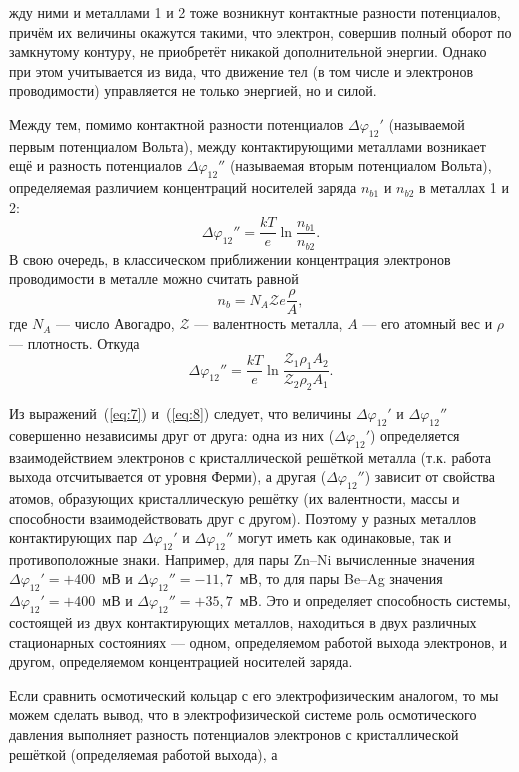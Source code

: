 \documentclass[12pt,a4paper]{article}
\begin{document}
жду ними и металлами 1 и 2 тоже возникнут контактные разности потенциалов,
причём их величины окажутся такими, что электрон, совершив полный оборот по
замкнутому контуру, не приобретёт никакой дополнительной энергии. Однако при
этом учитывается из вида, что движение тел (в том числе и электронов
проводимости) управляется не только энергией, но и силой.

Между тем, помимо контактной разности потенциалов $\Delta\varphi_{12}'$
(называемой первым потенциалом Вольта), между контактирующими металлами
возникает ещё и разность потенциалов $\Delta\varphi_{12}''$ (называемая вторым
потенциалом Вольта), определяемая различием концентраций носителей заряда
$n_{b1}$ и $n_{b2}$ в металлах 1 и 2:
\[
\Delta\varphi_{12}'' = \frac{kT}{e}\ln\frac{n_{b1}}{n_{b2}}.
\]
В свою очередь, в классическом приближении концентрация электронов проводимости
в металле можно считать равной
\[
n_b = N_A \mathcal{Z} e \frac{\rho}{A},
\]
где $N_A$ — число Авогадро, $\mathcal{Z}$ — валентность металла, $A$ — его
атомный вес и $\rho$ — плотность. Откуда
\begin{equation}
\Delta\varphi_{12}'' = \frac{kT}{e}\ln\frac{\mathcal{Z}_1 \rho_1 A_2}
{\mathcal{Z}_2 \rho_2 A_1}. \label{eq:8}
\end{equation}

Из выражений~(\ref{eq:7}) и~(\ref{eq:8}) следует, что величины $\Delta\varphi_{12}'$
и $\Delta\varphi_{12}''$ совершенно независимы друг от друга: одна из них
($\Delta\varphi_{12}'$) определяется взаимодействием электронов с кристаллической
решёткой металла (т.к. работа выхода отсчитывается от уровня Ферми), а другая
($\Delta\varphi_{12}''$) зависит от свойства атомов, образующих кристаллическую
решётку (их валентности, массы и способности взаимодействовать друг с другом).
Поэтому у разных металлов контактирующих пар $\Delta\varphi_{12}'$ и
$\Delta\varphi_{12}''$ могут иметь как одинаковые, так и противоположные знаки.
Например, для пары Zn--Ni вычисленные значения $\Delta\varphi_{12}' = +400$~мВ
и $\Delta\varphi_{12}'' = -11{,}7$~мВ, то для пары Be--Ag значения
$\Delta\varphi_{12}' = +400$~мВ и $\Delta\varphi_{12}'' = +35{,}7$~мВ. Это и
определяет способность системы, состоящей из двух контактирующих металлов,
находиться в двух различных стационарных состояниях — одном, определяемом
работой выхода электронов, и другом, определяемом концентрацией носителей
заряда.

Если сравнить осмотический кольцар с его электрофизическим аналогом, то мы
можем сделать вывод, что в электрофизической системе роль осмотического
давления выполняет разность потенциалов электронов с кристаллической решёткой
(определяемая работой выхода), а
\end{document}
